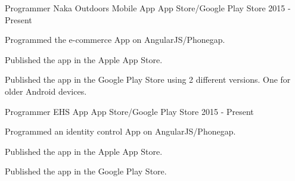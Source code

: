 \begin{cventries}
  \cventry
    {Programmer} %
    {Naka Outdoors Mobile App} %
    {App Store/Google Play Store} %
    {2015 - Present} %
    {
      \begin{cvitems} %
        \item {Programmed the e-commerce App on AngularJS/Phonegap.}
        \item {Published the app in the Apple App Store.}
        \item {Published the app in the Google Play Store using 2 different versions. One for older Android devices.}
      \end{cvitems}
    }
  \cventry
    {Programmer} %
    {EHS App} %
    {App Store/Google Play Store} %
    {2015 - Present} %
    {
      \begin{cvitems} %
        \item {Programmed an identity control App on AngularJS/Phonegap.}
        \item {Published the app in the Apple App Store.}
        \item {Published the app in the Google Play Store.}
      \end{cvitems}
    }

\end{cventries}

